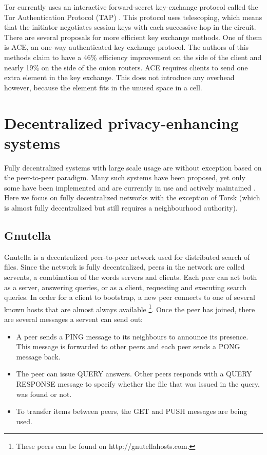 \documentclass[12pt,journal,compsoc]{IEEEtran}
\begin{document}
		Tor currently uses an interactive forward-secret key-exchange protocol called the Tor Authentication Protocol (TAP) \cite{backes2012ace}. This protocol uses telescoping, which means that the initiator negotiates session keys with each successive hop in the circuit. There are several proposals for more efficient key exchange methods. One of them is ACE, an one-way authenticated key exchange protocol. The authors of this methods claim to have a 46\% efficiency improvement on the side of the client and nearly 19\% on the side of the onion routers. ACE requires clients to send one extra element in the key exchange. This does not introduce any overhead however, because the element fits in the unused space in a cell.

\section{Decentralized \mbox{privacy-enhancing} systems}
	\label{sec:decentralized}
	
	Fully decentralized systems with large scale usage are without exception based on the peer-to-peer paradigm. Many such systems have been proposed, yet only some have been implemented and are currently in use and actively maintained \cite{mislove2004ap3, rennhard2002introducing, panchenko2006nisan, rowstron2001pastry, nambiar2006salsa, freedman2002tarzan, ripeanu2001peer, androutsellis2004survey}. Here we focus on fully decentralized networks with the exception of Torsk (which is almost fully decentralized but still requires a neighbourhood authority).

	\subsection{Gnutella} Gnutella is a decentralized peer-to-peer network used for distributed search of files. Since the network is fully decentralized, peers in the network are called servents, a combination of the words servers and clients. Each peer can act both as a server, answering queries, or as a client, requesting and executing search queries. In order for a client to bootstrap, a new peer connects to one of several known hosts that are almost always available \footnote{These peers can be found on http://gnutellahosts.com.}. Once the peer has joined, there are several messages a servent can send out:
	
		\begin{itemize}
			\item A peer sends a PING message to its neighbours to announce its presence. This message is forwarded to other peers and each peer sends a PONG message back.
			\item The peer can issue QUERY answers. Other peers responds with a QUERY RESPONSE message to specify whether the file that was issued in the query, was found or not.
			\item To transfer items between peers, the GET and PUSH messages are being used.
		\end{itemize}
		
\end{document}
